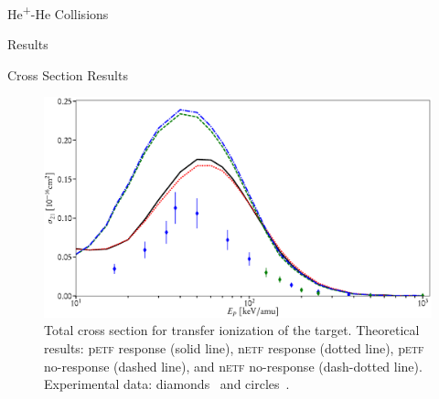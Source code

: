 \documentclass[a5paper, 9 pt]{extreport}
\begin{document}
\begin{chapter}{\texorpdfstring{He\textsuperscript{+}}{He+}-He Collisions \label{chap:hephe}}
\begin{section}{Results \label{sec:hephe-disc}}
\begin{subsection}{Cross Section Results \label{sec:hephe-res}}
         \begin{figure}[t]
            \centering
            \includegraphics[width = \linewidth]{./images/hephe-cross/HepHe-021.eps}
            \caption[Total cross section for transfer ionization of the target in
                     He\textsuperscript{+}-He collisions.]
                     {Total cross section for transfer ionization of the target.
                     Theoretical results: p\textsc{etf} response (solid line), n\textsc{etf} response
                                          (dotted line), p\textsc{etf} no-response (dashed line), and
                                          n\textsc{etf} no-response (dash-dotted line).
                     Experimental data: diamonds~\cite{Dub-89} and circles~\cite{FTFHLP-95}.
                     \label{fig:cs021}}
         \end{figure}


\end{subsection}
\end{section}
\end{chapter}
\end{document}
